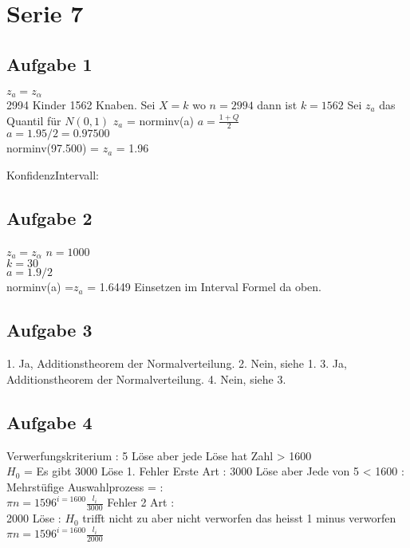\documentclass[a4paper,10pt]{scrbook}
\begin{document}
\chapter*{Serie 7}
\section*{Aufgabe 1}
$z_a = z_\alpha$\\
2994 Kinder 1562 Knaben.
Sei $X=k$ wo $n = 2994$ dann ist $k =1562$
Sei $z_a$ das Quantil für $N(0,1)$ $z_a$ = norminv(a) $ a = \frac{1 + Q}{2}$ \\
$ a = 1.95/2 = 0.97500$ \\
norminv(97.500) = $z_a$ = 1.96\\
\begin{framed}
KonfidenzIntervall:\\
 \begin{equation}
  [\frac{k}{n} - \frac{z_a}{n} \sqrt{\frac{k(n-k)}{n}},\frac{k}{n}+\frac{z_a}{n} \sqrt{\frac{k(n-k)}{n}}]
 \end{equation}

\end{framed}

\section*{Aufgabe 2}
$z_a = z_\alpha$
$ n = 1000$\\
$ k = 30$\\
$ a = 1.9/2$ \\
norminv(a) =$ z_a$ = 1.6449
Einsetzen im Interval Formel da oben.


\section*{Aufgabe 3}
1. Ja, Additionstheorem der Normalverteilung.
2. Nein, siehe 1.
3. Ja, Additionstheorem der Normalverteilung.
4. Nein, siehe 3.

\section*{Aufgabe 4}
Verwerfungskriterium : 5 Löse aber jede Löse hat Zahl > 1600\\
$H_0$ = Es gibt 3000 Löse
1. Fehler Erste Art : 3000 Löse aber Jede von 5 < 1600 : Mehrstüfige Auswahlprozess = : \\
$\pi{n=1596}^{i=1600} \frac{l_i}{3000}$
Fehler 2 Art :\\
2000 Löse : $H_0$ trifft nicht zu aber nicht verworfen das heisst 1 minus verworfen\\
$\pi{n=1596}^{i=1600} \frac{l_i}{2000}$
\end{document}
